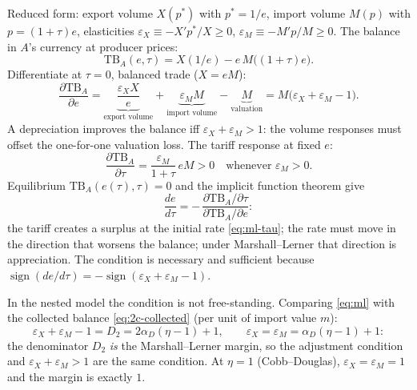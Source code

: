 \documentclass[11pt]{article}
\begin{document}
Reduced form: export volume $X(p^*)$ with $p^* = 1/e$, import volume $M(p)$ with $p = (1+\tau)e$, elasticities $\varepsilon_X \equiv -X'p^*/X \geq 0$, $\varepsilon_M \equiv -M'p/M \geq 0$. The balance in $A$'s currency at producer prices:
\begin{equation}
\mathrm{TB}_A(e, \tau) = X(1/e) - e\, M\big((1+\tau)e\big) .
\label{eq:ml-tb}
\end{equation}
Differentiate at $\tau = 0$, balanced trade ($X = eM$):
\begin{equation}
\frac{\partial \mathrm{TB}_A}{\partial e}
= \underbrace{\frac{\varepsilon_X X}{e}}_{\text{export volume}}
+ \underbrace{\varepsilon_M M}_{\text{import volume}}
- \underbrace{M}_{\text{valuation}}
= M \big( \varepsilon_X + \varepsilon_M - 1 \big) .
\label{eq:ml}
\end{equation}
A depreciation improves the balance iff $\varepsilon_X + \varepsilon_M > 1$: the volume responses must offset the one-for-one valuation loss. The tariff response at fixed $e$:
\begin{equation}
\frac{\partial \mathrm{TB}_A}{\partial \tau}
= \frac{\varepsilon_M}{1+\tau}\, e M > 0
\quad\text{whenever } \varepsilon_M > 0 .
\label{eq:ml-tau}
\end{equation}
Equilibrium $\mathrm{TB}_A(e(\tau), \tau) = 0$ and the implicit function theorem give
\begin{equation}
\frac{de}{d\tau} = -\, \frac{\partial \mathrm{TB}_A / \partial \tau}{\partial \mathrm{TB}_A / \partial e} :
\label{eq:ml-ift}
\end{equation}
the tariff creates a surplus at the initial rate \eqref{eq:ml-tau}; the rate must move in the direction that worsens the balance; under Marshall--Lerner that direction is appreciation. The condition is necessary and sufficient because $\operatorname{sign}(de/d\tau) = -\operatorname{sign}(\varepsilon_X + \varepsilon_M - 1)$.

In the nested model the condition is not free-standing. Comparing \eqref{eq:ml} with the collected balance \eqref{eq:2c-collected} (per unit of import value $m$):
\begin{equation}
\varepsilon_X + \varepsilon_M - 1 = D_2 = 2\alpha_D(\eta-1) + 1,
\qquad
\varepsilon_X = \varepsilon_M = \alpha_D(\eta - 1) + 1 :
\label{eq:ml-D2}
\end{equation}
the denominator $D_2$ \emph{is} the Marshall--Lerner margin, so the adjustment condition and $\varepsilon_X + \varepsilon_M > 1$ are the same condition. At $\eta = 1$ (Cobb--Douglas), $\varepsilon_X = \varepsilon_M = 1$ and the margin is exactly $1$.
\end{document}
